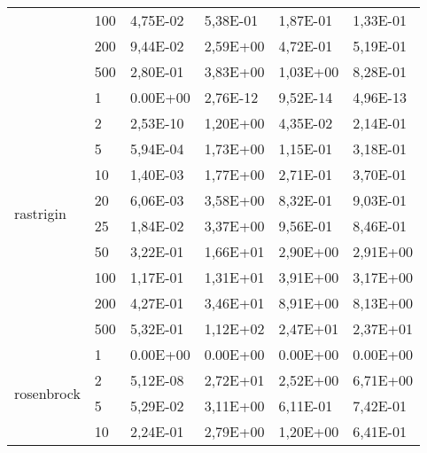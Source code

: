 \begin{longtable}[c]{|m{3.5cm}|l|l|l|l|l|}
                                        & 100       & 4,75E-02   & 5,38E-01   & 1,87E-01   & 1,33E-01  \\ \cline{2-6} 
                                        & 200       & 9,44E-02   & 2,59E+00   & 4,72E-01   & 5,19E-01  \\ \cline{2-6} 
                                        & 500       & 2,80E-01   & 3,83E+00   & 1,03E+00   & 8,28E-01  \\ \hline
\multirow{10}{*}{rastrigin}             & 1         & 0.00E+00   & 2,76E-12   & 9,52E-14   & 4,96E-13  \\ \cline{2-6} 
                                        & 2         & 2,53E-10   & 1,20E+00   & 4,35E-02   & 2,14E-01  \\ \cline{2-6} 
                                        & 5         & 5,94E-04   & 1,73E+00   & 1,15E-01   & 3,18E-01  \\ \cline{2-6} 
                                        & 10        & 1,40E-03   & 1,77E+00   & 2,71E-01   & 3,70E-01  \\ \cline{2-6} 
                                        & 20        & 6,06E-03   & 3,58E+00   & 8,32E-01   & 9,03E-01  \\ \cline{2-6} 
                                        & 25        & 1,84E-02   & 3,37E+00   & 9,56E-01   & 8,46E-01  \\ \cline{2-6} 
                                        & 50        & 3,22E-01   & 1,66E+01   & 2,90E+00   & 2,91E+00  \\ \cline{2-6} 
                                        & 100       & 1,17E-01   & 1,31E+01   & 3,91E+00   & 3,17E+00  \\ \cline{2-6} 
                                        & 200       & 4,27E-01   & 3,46E+01   & 8,91E+00   & 8,13E+00  \\ \cline{2-6} 
                                        & 500       & 5,32E-01   & 1,12E+02   & 2,47E+01   & 2,37E+01  \\ \hline
\multirow{10}{*}{rosenbrock}            & 1         & 0.00E+00   & 0.00E+00   & 0.00E+00   & 0.00E+00  \\ \cline{2-6} 
                                        & 2         & 5,12E-08   & 2,72E+01   & 2,52E+00   & 6,71E+00  \\ \cline{2-6} 
                                        & 5         & 5,29E-02   & 3,11E+00   & 6,11E-01   & 7,42E-01  \\ \cline{2-6} 
                                        & 10        & 2,24E-01   & 2,79E+00   & 1,20E+00   & 6,41E-01  \\ \cline{2-6} 

\end{longtable}
